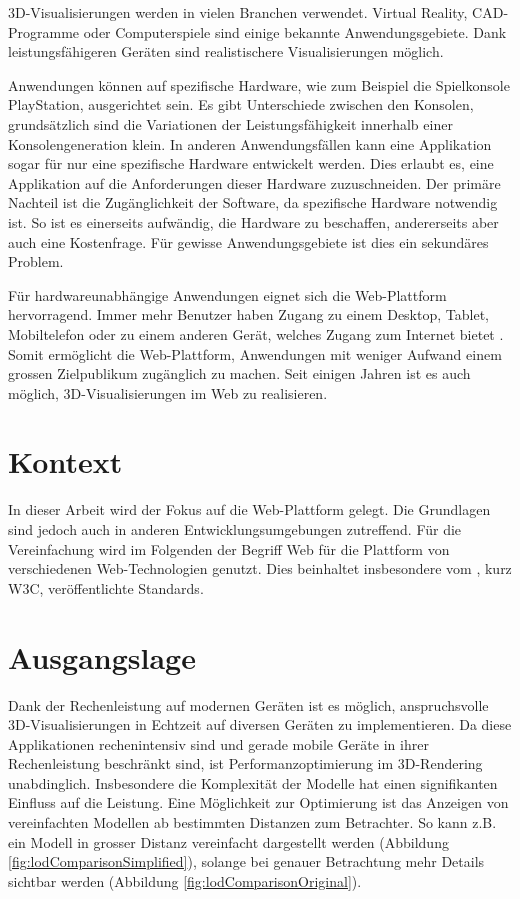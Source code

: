 
3D-Visualisierungen werden in vielen Branchen verwendet. Virtual Reality, CAD-Programme oder Computerspiele sind einige bekannte Anwendungsgebiete. Dank leistungsfähigeren Geräten sind realistischere Visualisierungen möglich.

Anwendungen können auf spezifische Hardware, wie zum Beispiel die Spielkonsole PlayStation, ausgerichtet sein. Es gibt Unterschiede zwischen den Konsolen, grundsätzlich sind die Variationen der Leistungsfähigkeit innerhalb einer Konsolengeneration klein. In anderen Anwendungsfällen kann eine Applikation sogar für nur eine spezifische Hardware entwickelt werden. Dies erlaubt es, eine Applikation auf die Anforderungen dieser Hardware zuzuschneiden. Der primäre Nachteil ist die Zugänglichkeit der Software, da spezifische Hardware notwendig ist. So ist es einerseits aufwändig, die Hardware zu beschaffen, andererseits aber auch eine Kostenfrage. Für gewisse Anwendungsgebiete ist dies ein sekundäres Problem.

Für hardwareunabhängige Anwendungen eignet sich die Web-Plattform hervorragend.
Immer mehr Benutzer haben Zugang zu einem Desktop, Tablet, Mobiltelefon oder zu einem anderen Gerät, welches Zugang zum Internet bietet \cite{peopleWithInternetAccess}.
Somit ermöglicht die Web-Plattform, Anwendungen mit weniger Aufwand einem grossen Zielpublikum zugänglich zu machen.
Seit einigen Jahren ist es auch möglich, 3D-Visualisierungen im Web zu realisieren.

\section{Kontext}
In dieser Arbeit wird der Fokus auf die Web-Plattform gelegt. Die Grundlagen sind jedoch auch in anderen Entwicklungsumgebungen zutreffend.
Für die Vereinfachung wird im Folgenden der Begriff Web für die Plattform von verschiedenen Web-Technologien genutzt. Dies beinhaltet insbesondere vom , kurz W3C, veröffentlichte Standards.

\section{Ausgangslage}
Dank der Rechenleistung auf modernen Geräten ist es möglich, anspruchsvolle 3D-Visualisierungen in Echtzeit auf diversen Geräten zu implementieren. Da diese Applikationen rechenintensiv sind und gerade mobile Geräte in ihrer Rechenleistung beschränkt sind, ist Performanzoptimierung im 3D-Rendering unabdinglich. Insbesondere die Komplexität der Modelle hat einen signifikanten Einfluss auf die Leistung.
Eine Möglichkeit zur Optimierung ist das Anzeigen von vereinfachten Modellen ab bestimmten Distanzen zum Betrachter. So kann z.B. ein Modell in grosser Distanz vereinfacht dargestellt werden (Abbildung \ref{fig:lodComparisonSimplified}), solange bei genauer Betrachtung mehr Details sichtbar werden (Abbildung \ref{fig:lodComparisonOriginal}).


